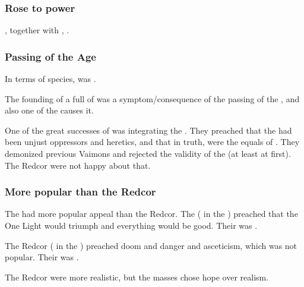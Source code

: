\subsubsection{Rose to power}
\Tepharae, together with , .





\subsubsection{Passing of the \Human Age}
In terms of species, \Telcra{} was . 

The founding of a \VaimonClan full of \scathae{} was a symptom/consequence of the passing of the , and also one of the causes it. 

One of the great successes of \ClanTelcra was integrating the \scathae. 
They preached that the  had been unjust oppressors and heretics, and that in truth, \scathae were the equals of \humans. 
They demonized previous Vaimons and rejected the validity of the \caliphate (at least at first).
The Redcor were not happy about that. 




\subsubsection{More popular than the Redcor}
The \Telcras had more popular appeal than the Redcor.
The \Telcras ( in the ) preached that the One Light would triumph and everything would be good.
Their \iquin was . 

The Redcor ( in the ) preached doom and danger and asceticism, which was not popular. 
Their \iquin was . 

The Redcor were more realistic, but the masses chose hope over realism. 









